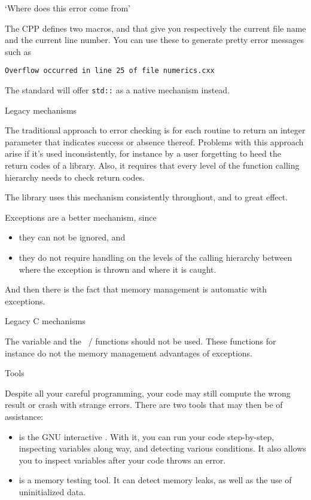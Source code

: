  {`Where does this error come from'}

The \ac{CPP} defines two macros,  and
 that give you respectively the current file name
and the current line number. You can use these to generate pretty
error messages such as
\begin{verbatim}
Overflow occurred in line 25 of file numerics.cxx
\end{verbatim}

The  standard will offer
\texttt{std::} as a native mechanism instead.

 {Legacy mechanisms}

The traditional approach to error checking is for each routine to
return an integer parameter that indicates success or absence
thereof. 
Problems with this approach arise if it's used inconsistently, for
instance by a user forgetting to heed the return codes of a library.
Also, it requires that every level of the function calling hierarchy
needs to check return codes.

The  library uses this mechanism
consistently throughout, and to great effect.

Exceptions are a better mechanism, since
\begin{itemize}
\item they can not be ignored, and
\item they do not require handling on the levels of the calling
  hierarchy between where the exception is thrown and where it is caught.
\end{itemize}
And then there is the fact that memory management is automatic with
exceptions.

 {Legacy C mechanisms}

The  variable and the
~/  functions should not be
used. These functions for instance do not the memory management
advantages of exceptions.

 {Tools}

Despite all your careful programming, your code may still compute the
wrong result or crash with strange errors. There are two tools that
may then be of assistance:
\begin{itemize}
\item {} is the GNU interactive
  . With it, you can run your code step-by-step,
  inspecting variables along way, and detecting various conditions. It
  also allows you to inspect variables after your code throws an
  error.
\item {} is a memory testing tool. It can detect
  memory leaks, as well as the use of uninitialized data.
\end{itemize}
